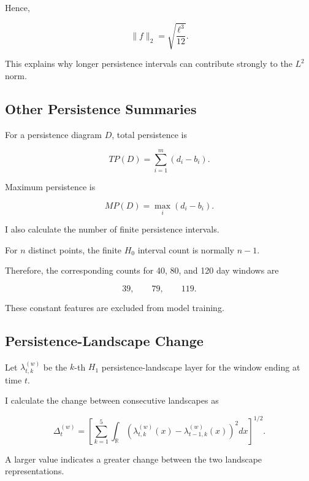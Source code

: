 \documentclass[oneside,english,11pt]{article}
\renewcommand{\boxed}[1]{#1}
\begin{document}
Hence,

\begin{equation}
\boxed{
\|f\|_2
=
\sqrt{\frac{\ell^3}{12}}.
}
\end{equation}

This explains why longer persistence intervals
can contribute strongly to the $L^2$ norm.

\subsection{Other Persistence Summaries}

For a persistence diagram $D$, total persistence is

\begin{equation}
\boxed{
TP(D)
=
\sum_{i=1}^{m}(d_i-b_i).
}
\end{equation}

Maximum persistence is

\begin{equation}
\boxed{
MP(D)
=
\max_i(d_i-b_i).
}
\end{equation}

I also calculate the number of finite
persistence intervals.

For $n$ distinct points, the finite $H_0$
interval count is normally $n-1$.

Therefore, the corresponding counts for
40, 80, and 120 day windows are

\begin{equation}
39,\qquad79,\qquad119.
\end{equation}

These constant features are excluded from
model training.

\subsection{Persistence-Landscape Change}

Let $\lambda_{t,k}^{(w)}$ be the $k$-th
$H_1$ persistence-landscape layer for the
window ending at time $t$.

I calculate the change between consecutive
landscapes as

\begin{equation}
\boxed{
\Delta_t^{(w)}
=
\left[
\sum_{k=1}^{5}
\int_{\mathbb{R}}
\left(
\lambda_{t,k}^{(w)}(x)
-
\lambda_{t-1,k}^{(w)}(x)
\right)^2dx
\right]^{1/2}.
}
\end{equation}

A larger value indicates a greater change
between the two landscape representations.
\end{document}
